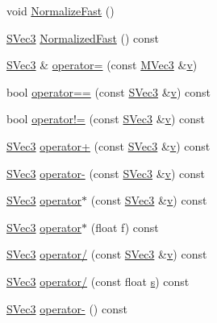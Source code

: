 \begin{CompactItemize}
void \hyperlink{struct_s_vec3_01a11562d5614c7b0b635b5ef9715c49}{NormalizeFast} ()
\item 
\hyperlink{struct_s_vec3}{SVec3} \hyperlink{struct_s_vec3_c7d0f668fc1d020f23c83df477e33ca2}{NormalizedFast} () const 
\item 
\hyperlink{struct_s_vec3}{SVec3} \& \hyperlink{struct_s_vec3_b50fa495fe66a74dfae638077e0bc850}{operator=} (const \hyperlink{class_m_vec3}{MVec3} \&\hyperlink{struct_s_vec3_e77f7ec6dd4b23199dce3e4dfaee9804}{v})
\item 
bool \hyperlink{struct_s_vec3_562f164e2c990dc5e870942b82e11004}{operator==} (const \hyperlink{struct_s_vec3}{SVec3} \&\hyperlink{struct_s_vec3_e77f7ec6dd4b23199dce3e4dfaee9804}{v}) const 
\item 
bool \hyperlink{struct_s_vec3_1149fc5a45c5b8fdbceddf313736be9c}{operator!=} (const \hyperlink{struct_s_vec3}{SVec3} \&\hyperlink{struct_s_vec3_e77f7ec6dd4b23199dce3e4dfaee9804}{v}) const 
\item 
\hyperlink{struct_s_vec3}{SVec3} \hyperlink{struct_s_vec3_64c7cbcbb060d5879af8e75b5a0f8a3e}{operator+} (const \hyperlink{struct_s_vec3}{SVec3} \&\hyperlink{struct_s_vec3_e77f7ec6dd4b23199dce3e4dfaee9804}{v}) const 
\item 
\hyperlink{struct_s_vec3}{SVec3} \hyperlink{struct_s_vec3_44a8977587b6d371890878767c5fe1e0}{operator-} (const \hyperlink{struct_s_vec3}{SVec3} \&\hyperlink{struct_s_vec3_e77f7ec6dd4b23199dce3e4dfaee9804}{v}) const 
\item 
\hyperlink{struct_s_vec3}{SVec3} \hyperlink{struct_s_vec3_0366aeb56a82c9455af3c1da0001c861}{operator$\ast$} (const \hyperlink{struct_s_vec3}{SVec3} \&\hyperlink{struct_s_vec3_e77f7ec6dd4b23199dce3e4dfaee9804}{v}) const 
\item 
\hyperlink{struct_s_vec3}{SVec3} \hyperlink{struct_s_vec3_e3d43793ba784f64df8bf332f1e8e2a7}{operator$\ast$} (float f) const 
\item 
\hyperlink{struct_s_vec3}{SVec3} \hyperlink{struct_s_vec3_453b45185eca2e60d4e42ccc3be6ad10}{operator/} (const \hyperlink{struct_s_vec3}{SVec3} \&\hyperlink{struct_s_vec3_e77f7ec6dd4b23199dce3e4dfaee9804}{v}) const 
\item 
\hyperlink{struct_s_vec3}{SVec3} \hyperlink{struct_s_vec3_9b3423fe8b3a948e79040e87e830fbf1}{operator/} (const float \hyperlink{glext__bak_8h_d585a1393cfa368fa9dc3d8ebff640d5}{s}) const 
\item 
\hyperlink{struct_s_vec3}{SVec3} \hyperlink{struct_s_vec3_0e2409af1f979a0253beebf4fdb65569}{operator-} () const 
\item 

\end{CompactItemize}
